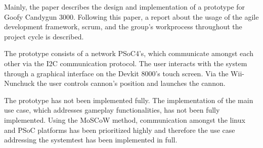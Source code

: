\noindent Mainly, the paper describes the design and implementation of a prototype for Goofy Candygun 3000. Following this paper, a report about the usage of the agile development framework, scrum, and the group's workprocess throughout the project cycle is described. \newline 

\noindent The prototype consists of a network PSoC4's, which communicate amongst each other via the I2C communication protocol. The user interacts with the system through a graphical interface on the Devkit 8000's touch screen. Via the Wii-Nunchuck the user controls cannon's position and launches the cannon. \newline

\noindent The prototype has not been implemented fully. The implementation of the main use case, which addresses gameplay functionalities, has not been fully implemented. Using the MoSCoW method, communication amongst the linux and PSoC platforms has been prioritized highly and therefore the use case addressing the systemtest has been implemented in full.    

